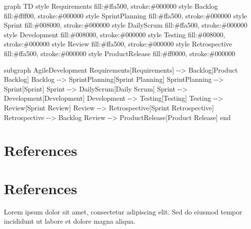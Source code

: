 \documentclass[
  letterpaper,
  DIV=11,
  numbers=noendperiod]{scrreprt}
\newenvironment{Shaded}{\begin{snugshade}}{\end{snugshade}}
\newcommand{\NormalTok}[1]{\textcolor[rgb]{0.00,0.23,0.31}{#1}}
\begin{document}
\begin{Shaded}
\begin{Highlighting}[]
\NormalTok{graph TD}
\NormalTok{style Requirements fill:\#ffa500, stroke:\#000000}
\NormalTok{style Backlog fill:\#ffff00, stroke:\#000000}
\NormalTok{style SprintPlanning fill:\#ffa500, stroke:\#000000}
\NormalTok{style Sprint fill:\#008000, stroke:\#000000}
\NormalTok{style DailyScrum fill:\#ffa500, stroke:\#000000}
\NormalTok{style Development fill:\#008000, stroke:\#000000}
\NormalTok{style Testing fill:\#008000, stroke:\#000000}
\NormalTok{style Review fill:\#ffa500, stroke:\#000000}
\NormalTok{style Retrospective fill:\#ffa500, stroke:\#000000}
\NormalTok{style ProductRelease fill:\#ff0000, stroke:\#000000}

\NormalTok{subgraph AgileDevelopment}
\NormalTok{    Requirements[Requirements] {-}{-}\textgreater{} Backlog[Product Backlog]}
\NormalTok{    Backlog {-}{-}\textgreater{} SprintPlanning[Sprint Planning]}
\NormalTok{    SprintPlanning {-}{-}\textgreater{} Sprint[Sprint]}
\NormalTok{    Sprint {-}{-}\textgreater{} DailyScrum[Daily Scrum]}
\NormalTok{    Sprint {-}{-}\textgreater{} Development[Development]}
\NormalTok{    Development {-}{-}\textgreater{} Testing[Testing]}
\NormalTok{    Testing {-}{-}\textgreater{} Review[Sprint Review]}
\NormalTok{    Review {-}{-}\textgreater{} Retrospective[Sprint Retrospective]}
\NormalTok{    Retrospective {-}{-}\textgreater{} Backlog}
\NormalTok{    Review {-}{-}\textgreater{} ProductRelease[Product Release]}
\NormalTok{end}
\end{Highlighting}
\end{Shaded}


\chapter{References}\label{references}


\chapter{References}\label{references-1}

Lorem ipsum dolor sit amet, consectetur adipiscing elit. Sed do eiusmod
tempor incididunt ut labore et dolore magna aliqua.
\end{document}
